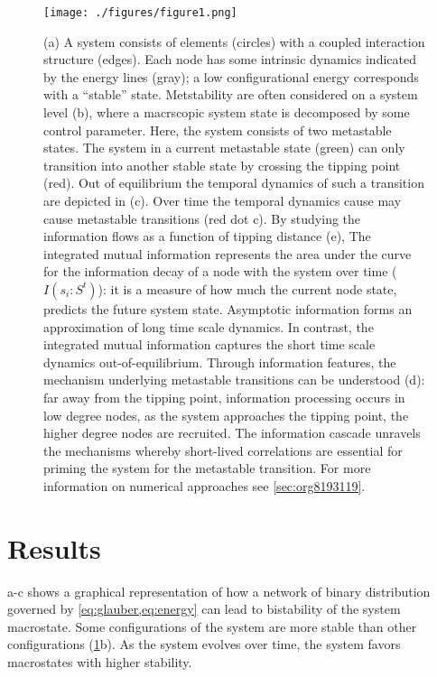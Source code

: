 \documentclass[a4paper, 11pt, twocolumn]{article}
\begin{document}
\begin{figure}
\centering
\texttt{[image: ./figures/figure1.png]}
\caption{\label{fig:introduction}(a) A system consists of elements (circles) with a coupled interaction structure (edges). Each node has some intrinsic dynamics indicated by the energy lines (gray); a low configurational energy corresponds with a ``stable'' state. Metstability are often considered on a system level (b), where a macrscopic system state is decomposed by some control parameter. Here, the system consists of two metastable states. The system in a current metastable state (green) can only transition into another stable state by crossing the tipping point (red). Out of equilibrium the temporal dynamics of such a transition are depicted in (c). Over time the temporal dynamics cause may cause metastable transitions (red dot c). By studying the information flows as a function of tipping distance (e), The integrated mutual information represents the area under the curve for the information decay of a node with the system over time ($I(s_i : S^t)$): it is a measure of how much the current node state, predicts the future system state. Asymptotic information forms an approximation of long time scale dynamics. In contrast, the integrated mutual information captures the short time scale dynamics out-of-equilibrium. Through information features, the mechanism underlying metastable transitions can be understood (d): far away from the tipping point, information processing occurs in low degree nodes, as the system approaches the tipping point, the higher degree nodes are recruited. The information cascade unravels the mechanisms whereby short-lived correlations are essential for priming the system for the metastable transition. For more information on numerical approaches see \ref{sec:org8193119}.}
\end{figure}

\section{Results}
\label{sec:org6f0b033}

 a-c shows a graphical representation of how a network of binary distribution governed by \cref{eq:glauber,eq:energy} can lead to bistability of the system macrostate. Some configurations of the system are more stable than other configurations (\cref{fig:introduction}b). As the system evolves over time, the system favors macrostates with higher stability.
\end{document}
